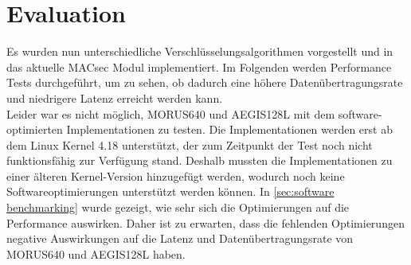 \chapter{Evaluation}
\label{sec:evaluation}



Es wurden nun unterschiedliche Verschlüsselungsalgorithmen vorgestellt und in das aktuelle \gls{MACsec Modul} implementiert.
Im Folgenden werden Performance Tests durchgeführt, um zu sehen, ob dadurch eine höhere Datenübertragungsrate und niedrigere Latenz erreicht werden kann.\\
Leider war es nicht möglich, MORUS640 und AEGIS128L mit dem software-optimierten Implementationen zu testen. Die Implementationen werden erst ab dem Linux Kernel 4.18 unterstützt, der zum Zeitpunkt der Test noch nicht funktionsfähig zur Verfügung stand. Deshalb mussten die Implementationen zu einer älteren Kernel-Version hinzugefügt werden, wodurch noch keine Softwareoptimierungen unterstützt werden können. In \ref{sec:software benchmarking} wurde gezeigt, wie sehr sich die Optimierungen auf die Performance auswirken. Daher ist zu erwarten, dass die fehlenden Optimierungen negative Auswirkungen auf die Latenz und Datenübertragungsrate von MORUS640 und AEGIS128L haben.
